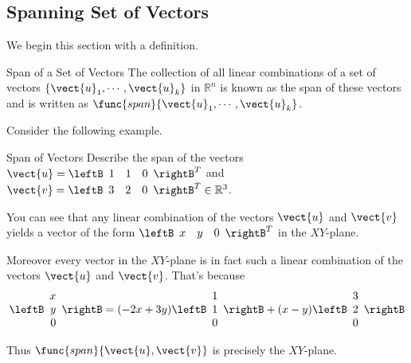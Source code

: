 \subsection{Spanning Set of Vectors}

We begin this section with a definition.

\begin{definition}{Span of a Set of Vectors}\label{def:span}
The collection of all linear combinations of a set of vectors $\{ \vect{u}_1,
\cdots ,\vect{u}_k\}$ in $\mathbb{R}^{n}$ is known as the span of these
vectors and is written as $\func{span} \{\vect{u}_1, \cdots , \vect{u}_k\}$.
 
\end{definition}

Consider the following example.

\begin{example}{Span of Vectors}\label{exa:spanvectors}
Describe the span of the vectors $\vect{u}=\leftB 
\begin{array}{rrr}
1  & 1 & 0
\end{array}
\rightB^T$ and
$\vect{v}=\leftB 
\begin{array}{rrr}
3  & 2 & 0
\end{array}
\rightB^T \in \mathbb{R}^{3}$.
\end{example}

\begin{solution}
You can see that any linear combination of the vectors $\vect{u}$ and $\vect{v}$ yields a vector of the form 
$\leftB 
\begin{array}{rrr}
x  & y & 0
\end{array}
\rightB^T$ in the $XY$-plane. 

Moreover every vector in the $XY$-plane is in fact such a linear
combination of the vectors $\vect{u}$ and $\vect{v}$. That's because
\[ \leftB 
\begin{array}{r}
x \\
y \\
 0
\end{array}
\rightB 
=
(-2x+3y) \leftB 
\begin{array}{r}
1  \\
1 \\
0
\end{array}
\rightB
+
(x-y)\leftB 
\begin{array}{r}
3 \\
2 \\
0
\end{array}
\rightB 
\]

Thus  $\func{span}\{\vect{u},\vect{v}\}$ is precisely the $XY$-plane.
\end{solution}

